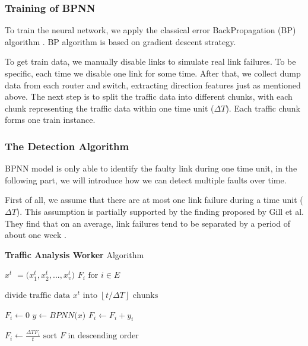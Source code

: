\documentclass{sig-alternate-05-2015}
\begin{document}
\subsubsection*{Training of BPNN}
\quad To train the neural network, we apply the classical error BackPropagation (BP) algorithm \cite{rumelhart1988learning}. BP algorithm is based on gradient descent strategy.%

To get train data, we manually disable links to simulate real link failures. To be specific, each time we disable one link for some time. After that, we collect dump data from each router and switch, extracting direction features just as mentioned above. The next step is to split the traffic data into different chunks, with each chunk representing the traffic data within one time unit ($\Delta T$). Each traffic chunk forms one train instance.

\subsubsection*{The Detection Algorithm}
\quad BPNN model is only able to identify the faulty link during one time unit, in the following part, we will introduce how we can detect multiple faults over time.

First of all, we assume that there are at most one link failure during a time unit ($\Delta T$). This assumption is partially supported by the finding proposed by Gill et al. They find that on an average, link failures tend to be separated by a period of about one week \cite{gill2011understanding}.

\renewcommand{\algorithmicrequire}{\textbf{Input:}}
\renewcommand{\algorithmicensure}{\textbf{Output:}}
\begin{algorithm}
	\caption{\textbf{Traffic Analysis Worker} Algorithm}
	\begin{algorithmic}[1]
        \REQUIRE \boldmath $x^t$ \unboldmath$=($\boldmath $x_1^t, x_2^t, ..., x_v^t$\unboldmath $)$
		\ENSURE $F_i \text{ for } i \in E$

        \STATE $\text{divide traffic data }$\boldmath $x^t$$\text{ into }$\unboldmath $\left\lfloor t/\Delta T \right\rfloor \text{ chunks}$

            \STATE $F_i \leftarrow 0$
        \ENDFOR
        \STATE \boldmath $y$\unboldmath $\leftarrow BPNN($\boldmath $x$\unboldmath $)$
                \STATE $F_i \leftarrow F_i + y_i$
            \ENDFOR
        \ENDFOR

            \STATE $F_i \leftarrow \frac{\Delta T F_i}{t}$
        \ENDFOR
        \STATE $\text{sort }$\boldmath $F$\unboldmath$\text{ in descending order}$
	\end{algorithmic}
\end{algorithm}
\end{document}
